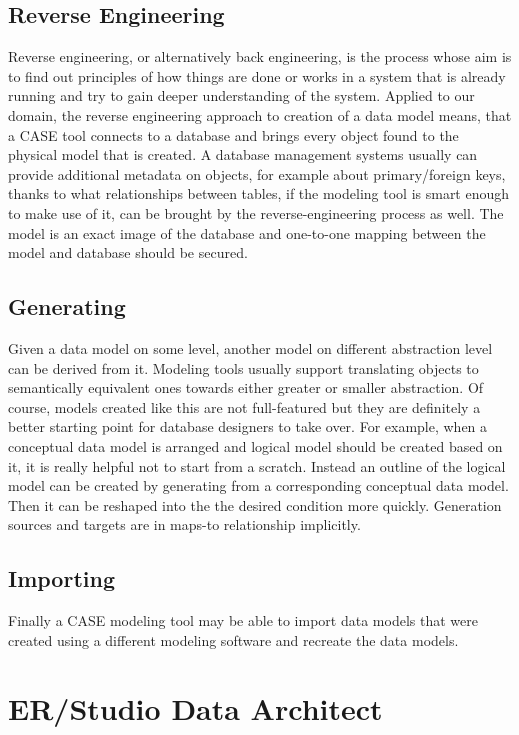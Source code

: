 \subsection{Reverse Engineering}
\label{data_model_reverse_engineering}
Reverse engineering, or alternatively back engineering, is the process whose aim is to find out principles of how things are done or works in a system that is already running and try to gain deeper understanding of the system.
Applied to our domain, the reverse engineering approach to creation of a data model means, that a CASE tool connects to a database and brings every object found to the physical model that is created. A database management systems usually can provide additional metadata on objects, for example about primary/foreign keys, thanks to what relationships between tables, if the modeling tool is smart enough to make use of it, can be brought by the reverse-engineering process as well.
The model is an exact image of the database and one-to-one mapping between the model and database should be secured.

\subsection{Generating}
\label{generating}
Given a data model on some level, another model on different abstraction level can be derived from it. Modeling tools usually support translating objects to semantically equivalent ones towards either greater or smaller abstraction. Of course, models created like this are not full-featured but they are definitely a better starting point for database designers to take over. 
For example, when a conceptual data model is arranged and logical model should be created based on it, it is really helpful not to start from a scratch. Instead an outline of the logical model can be created by generating from a corresponding conceptual data model. 
Then it can be reshaped into the the desired condition more quickly. 
Generation sources and targets are in maps-to relationship implicitly.

\subsection{Importing}
Finally a CASE modeling tool may be able to import data models that were created using a different modeling software and recreate the data models.

\section{ER/Studio Data Architect}

